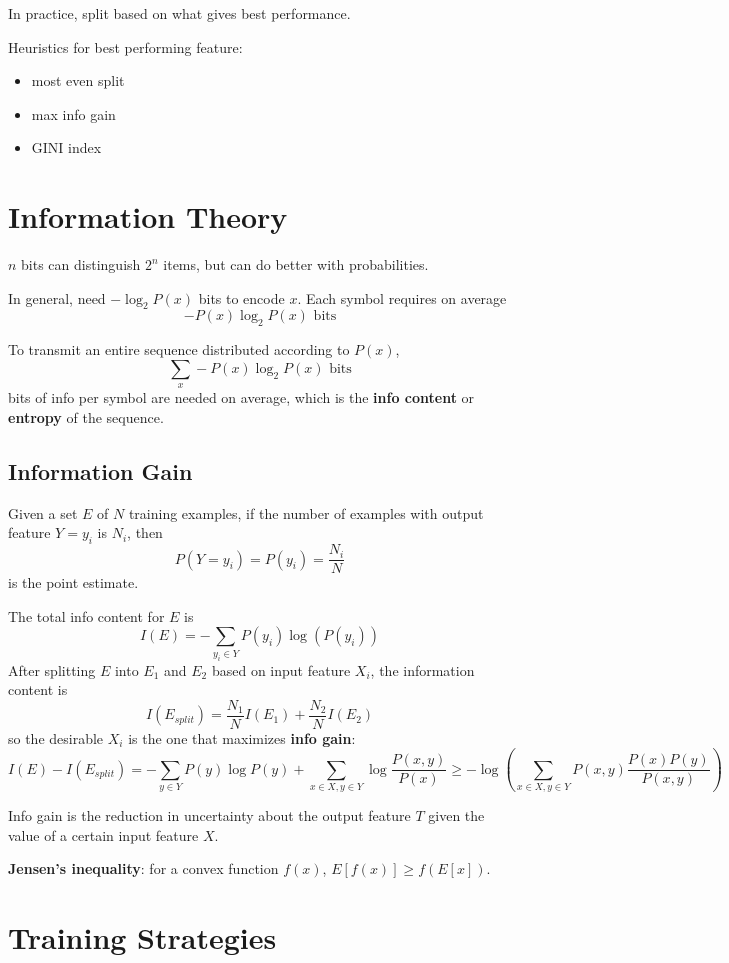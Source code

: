 \documentclass[11pt]{article}
\begin{document}
In practice, split based on what gives best performance.

Heuristics for best performing feature:
\begin{itemize}
\item most even split
\item max info gain
\item GINI index
\end{itemize}
\section{Information Theory}
\label{sec:orgd8f4b3c}
\(n\) bits can distinguish \(2^{n}\) items, but can do better with probabilities.

In general, need \(-\log_{2} P(x)\) bits to encode \(x\).
Each symbol requires on average
$$
-P(x)\log_{2} P(x) \text{ bits}
$$

To transmit an entire sequence distributed according to \(P(x)\),
$$
\sum_{x} -P(x)\log_{2} P(x) \text{ bits}
$$
bits of info per symbol are needed on average, which is the \textbf{info content} or \textbf{entropy} of the sequence.
\subsection{Information Gain}
\label{sec:org3e81235}
Given a set \(E\) of \(N\) training examples, if the number of examples with output feature \(Y = y_{i}\)
is \(N_{i}\), then
$$
P(Y = y_{i}) = P(y_{i}) = \frac{N_{i}}{N}
$$
is the point estimate.

The total info content for \(E\) is
$$
I(E) = - \sum_{y_{i} \in Y} P(y_{i}) \log( P(y_{i}) )
$$
After splitting \(E\) into \(E_{1}\) and \(E_{2}\) based on input feature \(X_{i}\), the information
content is
$$
I(E_{split}) = \frac{N_{1}}{N} I(E_{1}) + \frac{N_{2}}{N} I(E_{2})
$$
so the desirable \(X_{i}\) is the one that maximizes \textbf{info gain}:
$$
I(E) - I(E_{split}) = - \sum_{y \in Y} P(y) \log P(y) + \sum_{x \in X, y \in Y} \log \frac{P(x,y)}{P(x)}
\ge -\log \left( \sum_{x \in X, y \in Y} P(x, y) \frac{P(x)P(y)}{P(x, y)} \right)
$$

Info gain is the reduction in uncertainty about the output feature \(T\) given the value
of a certain input feature \(X\).

\textbf{Jensen's inequality}: for a convex function \(f(x)\), \(E[f(x)] \ge f(E[x])\).
\section{Training Strategies}
\label{sec:org09be2ee}
\end{document}
